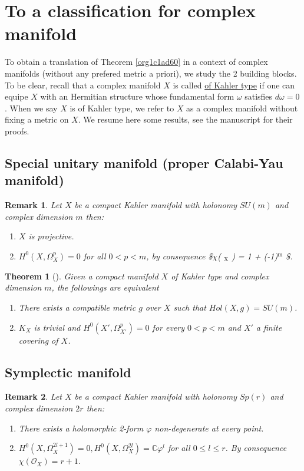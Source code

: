 \documentclass[11pt]{article}
\newtheorem{remark}{Remark}
\newtheorem{theorem}{Theorem}
\begin{document}
\section{To a classification for complex manifold}
\label{sec:org3ea9614}
To obtain a translation of Theorem \ref{org1c1ad60} in a context of complex manifolds (without any
prefered metric a priori), we study the 2 building blocks. To be clear, recall that a complex
manifold \(X\) is called \uline{of Kahler type} if one can equipe \(X\) with an Hermitian structure whose
fundamental form \(\omega\) satisfies \(d\omega= 0\). When we say \(X\) is of Kahler type, we refer to \(X\)
as a complex manifold without fixing a metric on \(X\). We resume here some results, see the
manuscript for their proofs.
\subsection{Special unitary manifold (proper Calabi-Yau manifold)}
\label{sec:org3909a88}
\begin{remark}
Let \(X\) be a compact Kahler manifold with holonomy \(SU(m)\) and complex dimension \(m\) then:
\begin{enumerate}
\item \(X\) is projective.
\item \(H^0(X, \Omega_X^p)=0\) for all \(0 < p < m\), by consequence \$\(\chi\)( \(_{\text{X}}\) ) = 1 + (-1)\(^{\text{m}}\) \$.
\end{enumerate}
\end{remark}

\begin{theorem}[]
Given a compact manifold \(X\) of Kahler type and complex dimension \(m\), the followings are equivalent
\begin{enumerate}
\item There exists a compatible metric \(g\) over \(X\) such that \(Hol(X,g) = SU(m)\).
\item \(K_X\) is trivial and \(H^0(X', \Omega_{X'}^p) =0\) for every \(0<p<m\) and \(X'\) a finite covering of \(X\).
\end{enumerate}
\end{theorem}

\subsection{Symplectic manifold}
\label{sec:orgc02533d}
\begin{remark}
Let \(X\) be a compact Kahler manifold with holonomy \(Sp(r)\) and complex dimension \(2r\) then:
\begin{enumerate}
\item There exists a holomorphic 2-form \(\varphi\) non-degenerate at every point.
\item \(H^0(X,\Omega_X^{2l+1}) = 0, H^0(X,\Omega_X^{2l})=\mathbb{C}\varphi^l\) for all \(0\leq l\leq
   r\). By consequence \(\chi(\mathcal{O}_X)=r+1\).
\end{enumerate}
\end{remark}
\end{document}
